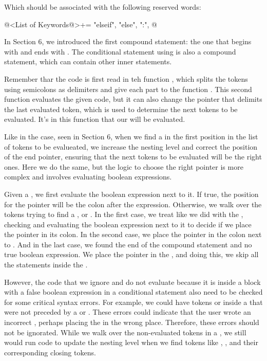 {{{{{Which should be associated with the following reserved words:

\iniciocodigo
@<List of Keywords@>+=
"elseif", "else", ":",
@
\fimcodigo

In Section 6, we introduced the first compound statement: the one that
begins with  and ends
with . The conditional statement
using  is also a compound statement, which can contain
other inner statements.

Remember thar the code is first read in teh
function , which splits the
tokens using semicolons as delimiters and give each part to the
function . This second function evaluates
the given code, but it can also change the pointer that delimits the
last evaluated token, which is used to determine the next tokens to be
evaluated. It's in this function that our  will be
evaluated.

Like in the  case, seen in Section 6, when we
find a  in the first position in the list of tokens to
be evalueated, we increase the nesting level and correct the position
of the end pointer, ensuring that the next tokens to be evaluated will
be the right ones. Here we do the same, but the logic to choose the
right pointer is more complex and involves evaluating boolean
expressions.

Given a , we first evaluate the boolean expression next
to it. If true, the position for the pointer will be the colon after
the expression. Otherwise, we walk over the tokens trying to find
a ,  or . In the
first case, we treat like we did with the , checking
and evaluating the boolean expression next to it to decide if we place
the pointer in its colon. In the second case, we place the pointer in
the colon next to . And in the last case, we found
the end of the compound statement and no true boolean expression. We
place the pointer in the , and doing this, we skip all
the statements inside the .

However, the code that we ignore and do not evaluate because it is
inside a block with a false boolean expression in a conditional
statement also need to be checked for some critical syntax errors. For
example, we could have tokens 
or  inside a  that were not
preceded by a  or . These
errors could indicate that the user wrote an
incorrect , perhaps placing the  in the
wrong place. Therefore, these errors should not be ignorated. While we
walk over the non-evaluated tokens in a , we still
would run code to update the nesting level when we find tokens
like , , 
and their corresponding closing tokens.

}}}}}
